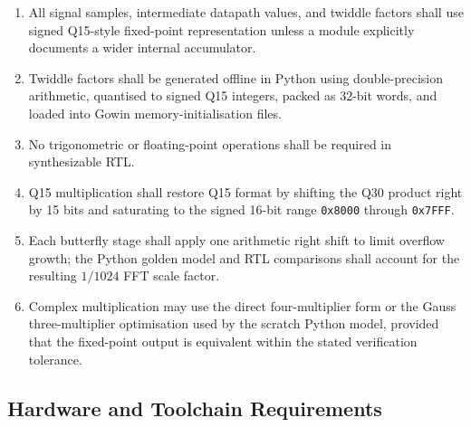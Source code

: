 \documentclass[12pt, a4paper]{article}
\begin{document}
\begin{enumerate}[leftmargin=*, label=\textbf{NUM-\arabic*:}]
    \item All signal samples, intermediate datapath values, and twiddle factors
          shall use signed Q15-style fixed-point representation unless a module
          explicitly documents a wider internal accumulator.
    \item Twiddle factors shall be generated offline in Python using
          double-precision arithmetic, quantised to signed Q15 integers, packed
          as 32-bit words, and loaded into Gowin memory-initialisation files.
    \item No trigonometric or floating-point operations shall be required in
          synthesizable RTL.
    \item Q15 multiplication shall restore Q15 format by shifting the Q30
          product right by 15 bits and saturating to the signed 16-bit range
          \texttt{0x8000} through \texttt{0x7FFF}.
    \item Each butterfly stage shall apply one arithmetic right shift to limit
          overflow growth; the Python golden model and RTL comparisons shall
          account for the resulting $1/1024$ FFT scale factor.
    \item Complex multiplication may use the direct four-multiplier form or the
          Gauss three-multiplier optimisation used by the scratch Python model,
          provided that the fixed-point output is equivalent within the stated
          verification tolerance.
\end{enumerate}

\subsection{Hardware and Toolchain Requirements}
\end{document}
